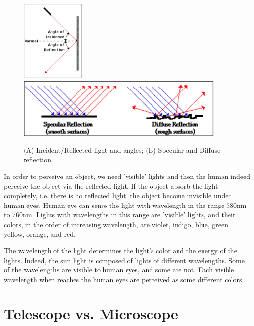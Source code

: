 \begin{figure}[hbt]
  \centerline{\includegraphics[height=4cm,
    angle=0]{./images/light_angle.eps}
\includegraphics[height=3cm,
    angle=0]{./images/light_diffuse_reflection.eps}}    
\caption{(A) Incident/Reflected light and angles; (B) Specular and Diffuse
reflection }
\label{fig:light_angle}
\end{figure}


\begin{framed}
In order to perceive an object, we need 'visible' lights and then the human
indeed perceive the object via the reflected light. If the object absorb the
light completely, i.e. there is no reflected light, the object become invisible
under human eyes. Human eye can sense the light with wavelength in the range
380nm to 760nm. Lights with wavelengths in this range are 'visible' lights, and
their colors, in the order of increasing wavelength, are violet, indigo, blue,
green, yellow, orange, and red. 
\end{framed}

The wavelength of the light determines the light's color and the energy of the
lights. Indeed, the sun light is composed of lights of different wavelengths.
Some of the wavelengths are visible to human eyes, and some are not. Each
visible wavelength when reaches the human eyes are perceived as some different
colors.

\section{Telescope vs. Microscope}

